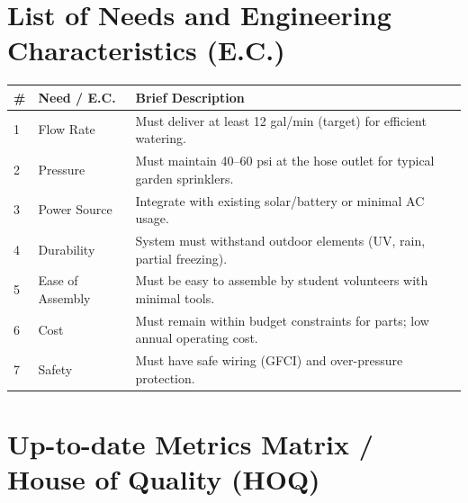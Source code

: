 \documentclass[12pt]{article}
\begin{document}
\section*{List of Needs and Engineering Characteristics (E.C.)}

\vspace{1em}
\begin{tabular}{p{0.5cm}p{5.5cm}p{8cm}}
\toprule
\textbf{\#} & \textbf{Need / E.C.} & \textbf{Brief Description} \\
\midrule
1 & Flow Rate & Must deliver at least 12 gal/min (target) for efficient watering. \\
2 & Pressure & Must maintain 40--60 psi at the hose outlet for typical garden sprinklers. \\
3 & Power Source & Integrate with existing solar/battery or minimal AC usage. \\
4 & Durability & System must withstand outdoor elements (UV, rain, partial freezing). \\
5 & Ease of Assembly & Must be easy to assemble by student volunteers with minimal tools. \\
6 & Cost & Must remain within budget constraints for parts; low annual operating cost. \\
7 & Safety & Must have safe wiring (GFCI) and over-pressure protection. \\
\bottomrule
\end{tabular}


\section*{Up-to-date Metrics Matrix / House of Quality (HOQ)}
\end{document}
